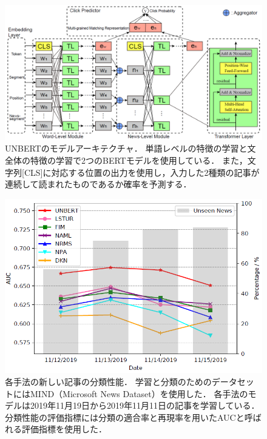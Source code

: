 \documentclass[12pt,a4j,dvipdfmx]{jreport}
\begin{document}
\begin{figure}[H]
	\centering
	\includegraphics[keepaspectratio, width=120mm]{img/unbert_model_architecture.png}
	\caption{
    UNBERTのモデルアーキテクチャ．
    \protect\footnotemark[11]
    単語レベルの特徴の学習と文全体の特徴の学習で2つのBERTモデルを使用している．
    また，文字列[CLS]に対応する位置の出力を使用し，入力した2種類の記事が連続して読まれたものであるか確率を予測する．
  }
	\label{fig_unbert_model_architecture}
\end{figure}

\begin{figure}[H]
	\centering
	\includegraphics[keepaspectratio, width=120mm]{img/unbert_evaluation.png}
	\caption{
    各手法の新しい記事の分類性能．
    \protect\footnotemark[12]
    学習と分類のためのデータセットにはMIND（Microsoft News Dataset）を使用した．
    各手法のモデルは2019年11月19日から2019年11月11日の記事を学習している．
    分類性能の評価指標には分類の適合率と再現率を用いたAUCと呼ばれる評価指標を使用した．
  }
	\label{fig_unbert_evaluation}
\end{figure}
\end{document}
